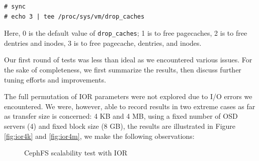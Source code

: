 \begin{Verbatim}[fontsize=\small]
# sync
# echo 3 | tee /proc/sys/vm/drop_caches
\end{Verbatim}


Here, 0 is the default value of \verb!drop_caches!; 1 is to free pagecaches, 2
is to free dentries and inodes, 3 is to free pagecache, dentries, and inodes.


Our first round of tests was less than ideal as we encountered various issues. For
the sake of completeness, we first summarize the results, then discuss
further tuning efforts and improvements.

The full permutation of IOR parameters were not explored due to I/O errors we encountered.
We were, however, able to record results in two extreme cases as far as
transfer size is concerned: 4 KB and 4 MB, using a fixed number of OSD servers
(4) and fixed block size (8 GB), the results are illustrated in Figure
\ref{fig:ior4k} and \ref{fig:ior4m}, we make the following observations:


\begin{figure}[!t]

\centerline{
\hfil
{}
}%
\caption{CephFS scalability test with IOR}

\end{figure}


